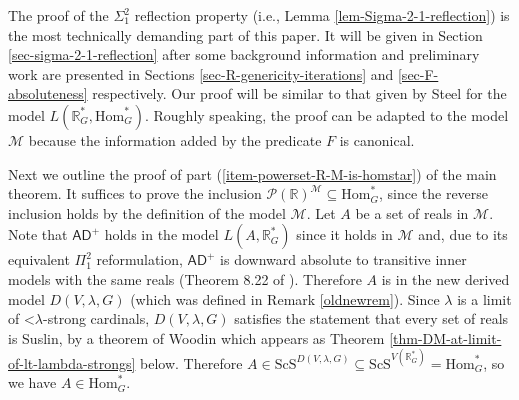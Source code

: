 \documentclass[fleqn, 11pt]{amsart}
\theoremstyle{plain}
\theoremstyle{definition}
\theoremstyle{remark}
\newcommand{\Hom}{\mathrm{Hom}}
\newcommand{\bfPi}{\bf{\Pi}}
\newcommand{\ScS}{\mathrm{ScS}}
\newcommand{\uB}{\mathrm{uB}}
\newcommand{\bbR}{\mathbb{R}}
\newcommand{\AD}{\mathsf{AD}}
\newcommand{\powerset}{\mathcal{P}}
\begin{document}


The proof of the $\Sigma^2_1$ reflection property (i.e., Lemma \ref{lem-Sigma-2-1-reflection}) is the most technically demanding part of this paper. It will be given in Section \ref{sec-sigma-2-1-reflection} after some background information and preliminary work are presented in Sections \ref{sec-R-genericity-iterations} and \ref{sec-F-absoluteness} respectively. Our proof will be similar to that given by Steel \cite{SteSTFree} for the model $L(\mathbb{R}^*_G, \Hom^*_G)$. Roughly speaking, the proof can be adapted to the model $\mathcal{M}$ because the information added by the predicate $F$ is canonical.




Next we outline the proof of part (\ref{item-powerset-R-M-is-homstar}) of the main theorem. It suffices to prove the inclusion $\powerset(\mathbb{R})^\mathcal{M} \subseteq \Hom^*_G$, since the reverse inclusion holds by the definition of the model $\mathcal{M}$. Let $A$ be a set of reals in $\mathcal{M}$. Note that $\mathsf{AD}^+$ holds in the model $L(A,\mathbb{R}^*_G)$ since it holds in $\mathcal{M}$ and,
due to its equivalent $\Pi^2_1$ reformulation,
$\AD^{+}$ is downward absolute to transitive inner models with the same reals (Theorem 8.22 of \cite{Larson:Extensions}). 
Therefore $A$ is in the new derived model $D(V,\lambda,G)$ (which was defined in Remark \ref{oldnewrem}). 
Since $\lambda$ is a limit of $\mathord{<}\lambda$-strong cardinals, $D(V,\lambda,G)$ satisfies the statement that every set of reals is Suslin, by a theorem of Woodin which appears as Theorem \ref{thm-DM-at-limit-of-lt-lambda-strongs} below.  %
Therefore $A \in \ScS^{D(V,\lambda,G)} \subseteq \ScS^{V(\mathbb{R}^*_G)} = \Hom^*_G$, so we have $A \in \Hom^*_G$.
\end{document}
